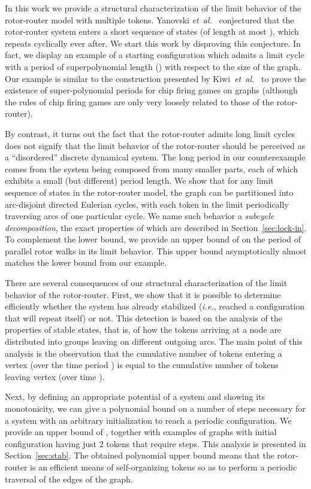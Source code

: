 \documentclass{article}[11pt,letter]
\newcommand{\ie}{{\it i.e.}\xspace}
\newcommand{\etal}{{\it et~al.}}
\begin{document}
In this work we provide a structural characterization of the limit behavior of the rotor-router model with multiple tokens. Yanovski \etal~\cite{YanovskiWB03} conjectured that the rotor-router system enters a short sequence of states (of length at most ), which repeats cyclically ever after. We start this work by disproving this conjecture. In fact, we display an example of a starting configuration which admits a limit cycle with a period of superpolynomial length () with respect to the size of the graph. Our example is similar to the construction presented by Kiwi~\etal~\cite{Kiwi94nopolynomial} to prove the existence of super-polynomial periods for chip firing games on graphs (although the rules of chip firing games are only very loosely related to those of the rotor-router).

By contrast, it turns out the fact that the rotor-router admits long limit cycles does not signify that the limit behavior of the rotor-router should be perceived as a ``disordered'' discrete dynamical system. The long period in our counterexample comes from the system being composed from many smaller parts, each of which exhibits a small (but different) period length. We show that for any limit sequence of states in the rotor-router model, the graph can be partitioned into arc-disjoint directed Eulerian cycles, with each token in the limit periodically traversing arcs of one particular cycle. We name such behavior a \emph{subcycle decomposition}, the exact properties of which are described in Section~\ref{sec:lock-in}. To complement the lower bound, we provide an upper bound of  on the period of parallel rotor walks in its limit behavior. This upper bound asymptotically almost matches the lower bound from our example.

There are several consequences of our structural characterization of the limit behavior of the rotor-router.
First, we show that it is possible to determine efficiently whether the system has already stabilized (\ie, reached a configuration that will repeat itself) or not. This detection is based on the analysis of the properties of stable states, that is, of how the tokens arriving at a node are distributed into groups leaving on different outgoing arcs. The main point of this analysis is the observation that the cumulative number of tokens entering a vertex  (over the time period ) is equal to the cumulative number of tokens leaving vertex  (over time ).

Next, by defining an appropriate potential of a system and showing its monotonicity, we can give a polynomial bound on a number of steps necessary for a system with an arbitrary initialization to reach a periodic configuration. We provide an upper bound of , together with examples of graphs with initial configuration having just 2 tokens that require  steps. This analysis is presented in Section~\ref{sec:stab}. The obtained polynomial upper bound means that the rotor-router is an efficient means of self-organizing tokens so as to perform a periodic traversal of the edges of the graph.
\end{document}
